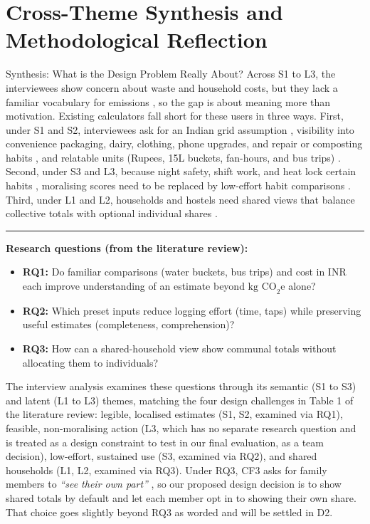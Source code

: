 \documentclass[12pt, a4paper]{article}
\begin{document}
\section{Cross-Theme Synthesis and Methodological Reflection}
\begin{synthesisbox}{Synthesis: What is the Design Problem Really About?}
Across S1 to L3, the interviewees show concern about waste and household costs, but they lack a familiar vocabulary for emissions \cite{gandhi2025, grinstein2018}, so the gap is about meaning more than motivation. Existing calculators fall short for these users in three ways. First, under S1 and S2, interviewees ask for an Indian grid assumption \cite{cf4}, visibility into convenience packaging, dairy, clothing, phone upgrades, and repair or composting habits \cite{cf1, cf3, cf4, cf10}, and relatable units (Rupees, 15L buckets, fan-hours, and bus trips) \cite{cf1, cf6, cf8}. Second, under S3 and L3, because night safety, shift work, and heat lock certain habits \cite{cf1, cf2, cf9}, moralising scores \cite{brynjarsdottir2012} need to be replaced by low-effort habit comparisons \cite{cf5, cf6}. Third, under L1 and L2, households and hostels need shared views that balance collective totals with optional individual shares \cite{cf1, cf3, cf7, cf10}.
\vspace{2pt}\hrule\vspace{3pt}
\textbf{Research questions (from the literature review):}
\begin{itemize}
    \item \textbf{RQ1:} Do familiar comparisons (water buckets, bus trips) and cost in INR each improve understanding of an estimate beyond $\text{kg CO}_2\text{e}$ alone?
    \item \textbf{RQ2:} Which preset inputs reduce logging effort (time, taps) while preserving useful estimates (completeness, comprehension)?
    \item \textbf{RQ3:} How can a shared-household view show communal totals without allocating them to individuals?
\end{itemize}
The interview analysis examines these questions through its semantic (S1 to S3) and latent (L1 to L3) themes, matching the four design challenges in Table 1 of the literature review: legible, localised estimates (S1, S2, examined via RQ1), feasible, non-moralising action (L3, which has no separate research question and is treated as a design constraint to test in our final evaluation, as a team decision), low-effort, sustained use (S3, examined via RQ2), and shared households (L1, L2, examined via RQ3). Under RQ3, CF3 asks for family members to \textit{``see their own part''} \cite{cf3}, so our proposed design decision is to show shared totals by default and let each member opt in to showing their own share. That choice goes slightly beyond RQ3 as worded and will be settled in D2.

\end{synthesisbox}
\end{document}
